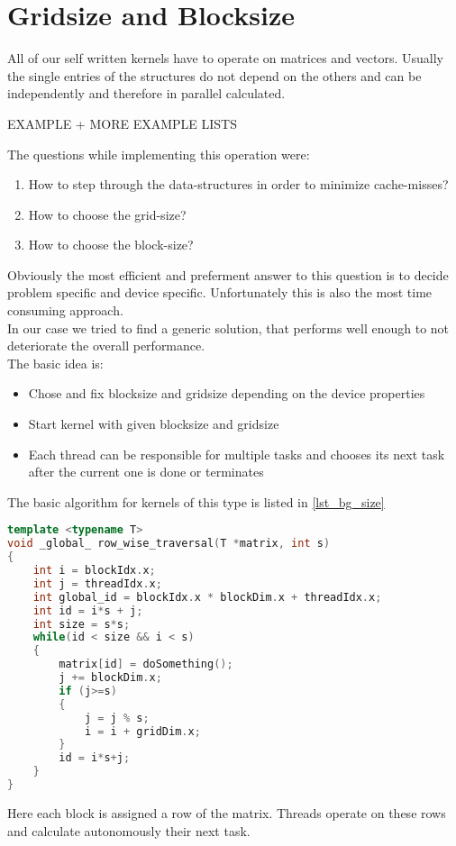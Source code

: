 \section{Gridsize and Blocksize} \label{sec_blockgridsize}
All of our self written kernels have to operate on matrices and vectors. Usually the single entries of the structures do not depend on the others and can be independently and therefore in parallel calculated.
\begin{center}
	EXAMPLE + MORE EXAMPLE LISTS
\end{center}
The questions while implementing this operation were:
\begin{enumerate}
	\item How to step through the data-structures in order to minimize cache-misses?
	\item How to choose the grid-size?
	\item How to choose the block-size?
\end{enumerate}

Obviously the most efficient and preferment answer to this question is to decide problem specific and device specific. Unfortunately this is also the most time consuming approach.\\
In our case we tried to find a generic solution, that performs well enough to not deteriorate the overall performance. \\

The basic idea is:
\begin{itemize}
	\item Chose and fix blocksize and gridsize depending on the device properties
	\item Start kernel with given blocksize and gridsize
	\item Each thread can be responsible for multiple tasks and chooses its next task after the current one is done or terminates
\end{itemize}

The basic algorithm  for kernels of this type is listed in \ref{lst_bg_size}

\begin{lstlisting}[caption={\label{lst_bg_size}}, language=cpp]
template <typename T>
void _global_ row_wise_traversal(T *matrix, int s)
{
	int i = blockIdx.x;
	int j = threadIdx.x;
	int global_id = blockIdx.x * blockDim.x + threadIdx.x;
	int id = i*s + j;
	int size = s*s;
	while(id < size && i < s)
	{
		matrix[id] = doSomething();
		j += blockDim.x;
		if (j>=s)
		{
			j = j % s;
			i = i + gridDim.x;
		}
		id = i*s+j;
	}
}
\end{lstlisting}
Here each block is assigned a row of the matrix. Threads operate on these rows and calculate autonomously their next task.

